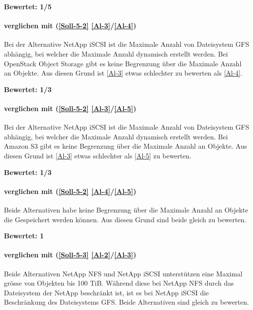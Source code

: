\textbf{Bewertet: 1/5}

\paragraph*{  verglichen mit  (\ref{Soll-5-2} \ref{Al-3}/\ref{Al-4})}
Bei der Alternative NetApp iSCSI ist die Maximale Anzahl von Dateisystem GFS abhängig, bei welcher die Maximale Anzahl dynamisch erstellt werden. Bei OpenStack Object Storage gibt es keine Begrenzung über die Maximale Anzahl an Objekte. Aus diesen Grund ist  \ref{Al-3} etwas schlechter zu bewerten als  \ref{Al-4}.

\textbf{Bewertet: 1/3}

\paragraph*{  verglichen mit  (\ref{Soll-5-2} \ref{Al-3}/\ref{Al-5})}
Bei der Alternative NetApp iSCSI ist die Maximale Anzahl von Dateisystem GFS abhängig, bei welcher die Maximale Anzahl dynamisch erstellt werden. Bei Amazon S3 gibt es keine Begrenzung über die Maximale Anzahl an Objekte. Aus diesen Grund ist  \ref{Al-3} etwas schlechter als  \ref{Al-5} zu bewerten.

\textbf{Bewertet: 1/3}


\paragraph*{  verglichen mit  (\ref{Soll-5-2} \ref{Al-4}/\ref{Al-5})}
Beide Alternativen habe keine Begrenzung über die Maximale Anzahl an Objekte die Gespeichert werden können. Aus diesen Grund sind beide gleich zu bewerten.

\textbf{Bewertet: 1}


\paragraph*{  verglichen mit  (\ref{Soll-5-3} \ref{Al-2}/\ref{Al-3})}
Beide Alternativen NetApp NFS und NetApp iSCSI unterstützen eine Maximal grösse von Objekten bis 100 TiB. Während diese bei NetApp NFS durch das Dateisystem der NetApp beschränkt ist, ist es bei NetApp iSCSI die Beschränkung des Dateisystems GFS. Beide Alternativen sind gleich zu bewerten.

